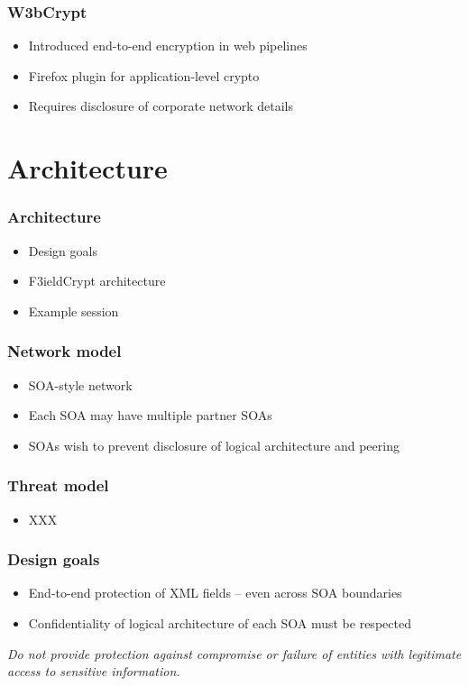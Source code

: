 \documentclass{beamer}
\begin{document}
\begin{frame}
\frametitle{W3bCrypt}
\begin{itemize}
\item Introduced end-to-end encryption in web pipelines
\item Firefox plugin for application-level crypto
\item Requires disclosure of corporate network details
\end{itemize}
\end{frame}

\section{Architecture}
\begin{frame}
\frametitle{Architecture}
\begin{itemize}
\item Design goals
\item F3ieldCrypt architecture
\item Example session
\end{itemize}
\end{frame}

\begin{frame}
\frametitle{Network model}
\begin{itemize}
\item SOA-style network
\item Each SOA may have multiple partner SOAs
\item SOAs wish to prevent disclosure of logical architecture and peering 
\end{itemize}
\end{frame}

\begin{frame}
\frametitle{Threat model}
\begin{itemize}
\item XXX
\end{itemize}
\end{frame}

\begin{frame}
\frametitle{Design goals}
\begin{itemize}
\item End-to-end protection of XML fields -- even across SOA boundaries
\item Confidentiality of logical architecture of each SOA must be respected
\end{itemize}
\emph{Do not provide protection against compromise or failure of entities with
legitimate access to sensitive information.}
\end{frame}
\end{document}
